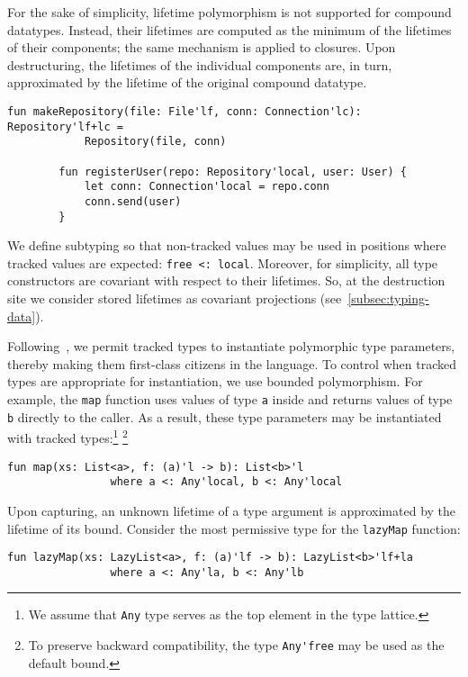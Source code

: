 \documentclass[11pt]{article}
\begin{document}
    For the sake of simplicity, lifetime polymorphism is not supported for compound datatypes.
    Instead, their lifetimes are computed as the minimum of the lifetimes of their components; the same mechanism is applied to closures.
    Upon destructuring, the lifetimes of the individual components are, in turn, approximated by the lifetime of the original compound datatype.
    \begin{lstlisting}[language=colang]
        fun makeRepository(file: File'lf, conn: Connection'lc): Repository'lf+lc =
            Repository(file, conn)

        fun registerUser(repo: Repository'local, user: User) {
            let conn: Connection'local = repo.conn
            conn.send(user)
        }
    \end{lstlisting}

    We define subtyping so that non-tracked values may be used in positions where tracked values are expected: \lstinline[language=colang]|free <: local|.
    Moreover, for simplicity, all type constructors are covariant with respect to their lifetimes.
    So, at the destruction site we consider stored lifetimes as covariant projections (see\ \ref{subsec:typing-data}). %

    Following~\cite{boruch2023capturing}, we permit tracked types to instantiate polymorphic type parameters, thereby making them first-class citizens in the language.
    To control when tracked types are appropriate for instantiation, we use bounded polymorphism.
    For example, the \lstinline[language=colang]|map| function uses values of type \lstinline[language=colang]|a| inside and returns values of type \lstinline[language=colang]|b| directly to the caller.
    As a result, these type parameters may be instantiated with tracked types:\footnote{We assume that \lstinline[language=colang]|Any| type serves as the top element in the type lattice.} \footnote{To preserve backward compatibility, the type \lstinline[language=colang]|Any'free| may be used as the default bound.}
    \begin{lstlisting}[language=colang]
        fun map(xs: List<a>, f: (a)'l -> b): List<b>'l
                where a <: Any'local, b <: Any'local
    \end{lstlisting}

    Upon capturing, an unknown lifetime of a type argument is approximated by the lifetime of its bound.
    Consider the most permissive type for the \lstinline[language=colang]|lazyMap| function:
    \begin{lstlisting}[language=colang]
        fun lazyMap(xs: LazyList<a>, f: (a)'lf -> b): LazyList<b>'lf+la
                where a <: Any'la, b <: Any'lb
    \end{lstlisting}
\end{document}

